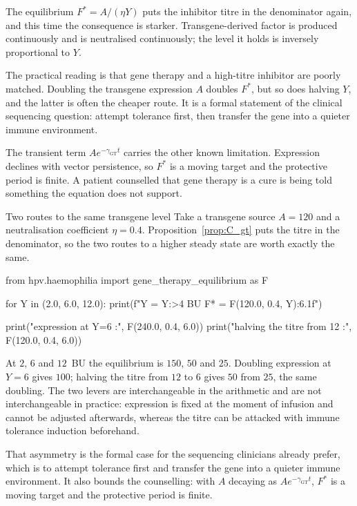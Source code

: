\begin{reading}
The equilibrium $F^\ast=A/(\eta Y)$ puts the inhibitor titre in the
denominator again, and this time the consequence is starker. Transgene-derived
factor is produced continuously and is neutralised continuously; the level it
holds is inversely proportional to $Y$.

The practical reading is that gene therapy and a high-titre inhibitor are
poorly matched. Doubling the transgene expression $A$ doubles $F^\ast$, but so
does halving $Y$, and the latter is often the cheaper route. It is a formal
statement of the clinical sequencing question: attempt tolerance first, then
transfer the gene into a quieter immune environment.

The transient term $Ae^{-\gamma_{\text{GT}}t}$ carries the other known
limitation. Expression declines with vector persistence, so $F^\ast$ is a
moving target and the protective period is finite. A patient counselled that
gene therapy is a cure is being told something the equation does not support.
\end{reading}

\begin{workedexample}[apc-gt]{Two routes to the same transgene level}
Take a transgene source $A=120$ and a neutralisation coefficient $\eta=0.4$.
Proposition~\ref{prop:C_gt} puts the titre in the denominator, so the two
routes to a higher steady state are worth exactly the same.

\begin{wecode}[Python]
from hpv.haemophilia import gene_therapy_equilibrium as F

for Y in (2.0, 6.0, 12.0):
    print(f"Y = {Y:>4} BU   F* = {F(120.0, 0.4, Y):6.1f}")

print("\ndoubling expression at Y=6 :", F(240.0, 0.4, 6.0))
print("halving the titre from 12  :", F(120.0, 0.4, 6.0))
\end{wecode}

\noindent At $2$, $6$ and $12$~BU the equilibrium is $150$, $50$ and $25$.
Doubling expression at $Y=6$ gives $100$; halving the titre from $12$ to $6$
gives $50$ from $25$, the same doubling. The two levers are interchangeable in
the arithmetic and are not interchangeable in practice: expression is fixed at
the moment of infusion and cannot be adjusted afterwards, whereas the titre can
be attacked with immune tolerance induction beforehand.

That asymmetry is the formal case for the sequencing clinicians already prefer,
which is to attempt tolerance first and transfer the gene into a quieter immune
environment. It also bounds the counselling: with $A$ decaying as
$Ae^{-\gamma_{\text{GT}}t}$, $F^\ast$ is a moving target and the protective
period is finite.

\end{workedexample}

